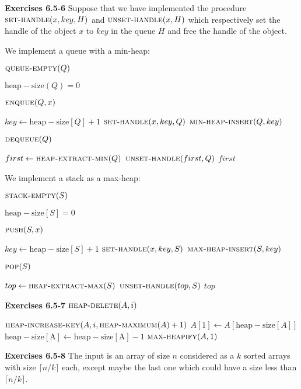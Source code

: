 \documentclass[a4paper,12pt]{article}
\newcommand{\newpar}[1]
{\bigskip \noindent \textbf{Exercises #1} \newline}
\newcommand{\la}{\leftarrow}
\newenvironment{alg}[2]
               {\noindent $\textsc{#1}(#2)$ \begin{algorithmic}}
               {\end{algorithmic}}
\begin{document}
\newpar{6.5-6} Suppose that we have implemented the procedure
$\textsc{set-handle}(x, key, H)$ and $\textsc{unset-handle}(x, H)$
which respectively set the handle of the object $x$ to $key$ in the
queue $H$ and free the handle of the object.

We implement a queue with a min-heap:

\begin{alg}{queue-empty}{Q}
  \RETURN $\mathrm{heap-size}(Q) = 0$
\end{alg}

\medskip
\begin{alg}{enquue}{Q, x}
  \STATE $key \la \mathrm{heap-size}[Q] + 1$
  \STATE $\textsc{set-handle}(x, key, Q)$
  \STATE $\textsc{min-heap-insert}(Q, key)$
\end{alg}

\medskip
\begin{alg}{dequeue}{Q}
  \STATE $first \la \textsc{heap-extract-min}(Q)$
  \STATE $\textsc{unset-handle}(first, Q)$
  \RETURN $first$
\end{alg}

\bigskip
We implement a stack as a max-heap:

\begin{alg}{stack-empty}{S}
  \RETURN $\mathrm{heap-size}[S] = 0$
\end{alg}

\medskip
\begin{alg}{push}{S, x}
  \STATE $key \la \mathrm{heap-size}[S] + 1$
  \STATE $\textsc{set-handle}(x, key, S)$
  \STATE $\textsc{max-heap-insert}(S, key)$
\end{alg}

\medskip
\begin{alg}{pop}{S}
  \STATE $top \la \textsc{heap-extract-max}(S)$
  \STATE $\textsc{unset-handle}(top, S)$
  \RETURN $top$
\end{alg}

\newpar{6.5-7}
\begin{alg}{heap-delete}{A, i}
  \STATE $\textsc{heap-increase-key}(A, i,
  \textsc{heap-maximum}(A)+1)$
  \STATE $A[1] \la A[\mathrm{heap-size}[A]]$
  \STATE $\mathrm{heap-size[A]} \la \mathrm{heap-size[A]} - 1$
  \STATE $\textsc{max-heapify}(A, 1)$
\end{alg}

\newpar{6.5-8} The input is an array of size $n$ considered as a $k$
sorted arrays with size $\lceil n/k\rceil$ each, except maybe the last
one which could have a size less than $\lceil n/k\rceil$.
\end{document}
